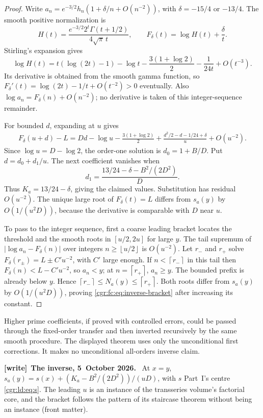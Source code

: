 \documentclass[11pt,letterpaper]{article}
\numberwithin{equation}{section}
\theoremstyle{definition}\newtheorem{definition}[theorem]{Definition}
\theoremstyle{remark}\newtheorem{remark}[theorem]{Remark}
\newcommand{\ceil}[1]{\left\lceil #1\right\rceil}
\newcommand{\floor}[1]{\left\lfloor #1\right\rfloor}
\newenvironment{writenote}[1][]{\par\smallskip\begingroup\small
 \noindent\textbf{[write]}\if\relax\detokenize{#1}\relax\else~\textbf{#1.}\fi\ }%
 {\par\endgroup\smallskip}
\begin{document}
\begin{proof}
Write $a_n=e^{-3/2}h_n(1+\delta/n+O(n^{-2}))$, with
$\delta=-15/4$ or $-13/4$. The smooth positive normalization is
\[
 H(t)=\frac{e^{-3/2}2^t\Gamma(t+1/2)}{4\sqrt\pi\,t},
 \qquad F_\delta(t)=\log H(t)+\frac\delta t.
\]
Stirling's expansion gives
\begin{equation}\label{cgr:fc:eq:smoothlog}
 \log H(t)=t(\log(2t)-1)-\log t
 -\frac{3(1+\log2)}2-\frac1{24t}+O(t^{-3}).
\end{equation}
Its derivative is obtained from the smooth gamma function, so
$F_\delta'(t)=\log(2t)-1/t+O(t^{-2})>0$ eventually.
Also $\log a_n=F_\delta(n)+O(n^{-2})$; no derivative is taken
of this integer-sequence remainder.

For bounded $d$, expanding at $u$ gives
\begin{align*}
 F_\delta(u+d)-L
 =Dd-\log u-\frac{3(1+\log2)}2
 +\frac{d^2/2-d-1/24+\delta}{u}+O(u^{-2}).
\end{align*}
Since $\log u=D-\log2$, the order-one solution is
$d_0=1+B/D$. Put $d=d_0+d_1/u$. The next coefficient vanishes
when
\[
 d_1=\frac{13/24-\delta-B^2/(2D^2)}D.
\]
Thus $K_a=13/24-\delta$, giving the claimed values. Substitution
has residual $O(u^{-2})$. The unique large root of
$F_\delta(t)=L$ differs from $s_a(y)$ by $O(1/(u^2D))$,
because the derivative is comparable with $D$ near $u$.

To pass to the integer sequence, first a coarse leading bracket
locates the threshold and the smooth roots in $[u/2,2u]$ for
large $y$. The tail supremum of
$|\log a_n-F_\delta(n)|$ over integers $n\ge\floor{u/2}$ is
$O(u^{-2})$. Let $r_-$ and $r_+$ solve
$F_\delta(r_\pm)=L\pm C'u^{-2}$, with $C'$ large enough.
If $n<\ceil{r_-}$ in this tail then $F_\delta(n)<L-C'u^{-2}$,
so $a_n<y$; at $n=\ceil{r_+}$, $a_n\ge y$.
The bounded prefix is already below $y$. Hence
$\ceil{r_-}\le N_a(y)\le\ceil{r_+}$.
Both roots differ from $s_a(y)$ by $O(1/(u^2D))$, proving
\eqref{cgr:fc:eq:inverse-bracket} after increasing its constant.
\end{proof}

Higher prime coefficients, if proved with controlled errors, could
be passed through the fixed-order transfer and then inverted
recursively by the same smooth procedure. The displayed theorem
uses only the unconditional first corrections. It makes no
unconditional all-orders inverse claim.
\begin{writenote}[The inverse, 5~October 2026]
At $x=y$, $s_a(y)=s(x)+(K_a-B^2/(2D^2))/(uD)$, with $s$ Part~I's centre \eqref{cgr:ld:eq:s}. The leading $u$ is an instance of the transseries volume's factorial core, and the bracket follows the pattern of its staircase theorem without being an instance (front matter).
\end{writenote}
\end{document}
